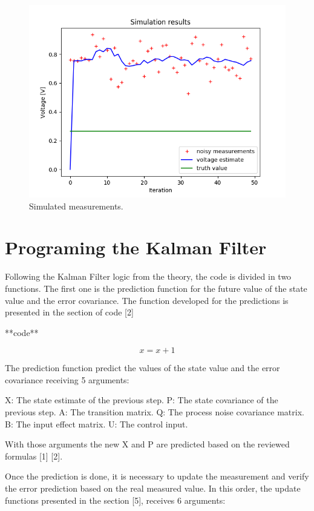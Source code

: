 \documentclass{article}
\begin{document}
    \begin{figure}
        \includegraphics{./img/nc_.png}
        \caption{Simulated measurements.}
        \label{fig:data}
    \end{figure}
      

    \section{Programing the Kalman Filter}

    Following the Kalman Filter logic from the theory, the code is divided in two functions. The first one is the  prediction function for the
    future value of the state value and the error covariance. The function developed for the predictions is presented in the section of code [2]

    **code**

    \begin{equation}
        x = x + 1
    \end{equation}

    The prediction function predict the values of the state value and the error covariance receiving 5 arguments:

    X: The state estimate of the previous step.
    P: The state covariance of the previous step.
    A: The transition matrix.
    Q: The process noise covariance matrix.
    B: The input effect matrix.
    U: The control input.

    With those arguments the new X and P are predicted based on the reviewed formulas [1] [2].

    Once the prediction is done, it is necessary to update the measurement and verify the error prediction based on the real measured value.
    In this order, the update functions presented in the section [5], receives 6 arguments:
\end{document}
